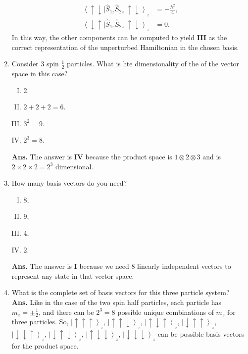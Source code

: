 \documentclass[12pt]{article}
\newcommand\half{\frac{1}{2}}
\newcommand\rr{\right \rangle}
\newcommand\ls{\left |}
\begin{document}
\begin{enumerate}[1.]
$$\begin{aligned}
             \left \langle \uparrow \downarrow \right | \hat{S}_{1z} \hat{S}_{2z} \left | \uparrow \downarrow \right \rangle _z & = -\frac{\hbar^2}{4}, \\
             \left \langle \downarrow \uparrow \right | \hat{S}_{1z} \hat{S}_{2z} \left | \uparrow \downarrow \right \rangle _z & = 0.
       \end{aligned}
       $$
       In this way, the other components can be computed to yield \textbf{III} as the correct representation of the unperturbed Hamiltonian in the chosen basis.
\item Consider 3 spin $\frac{1}{2}$ particles. What is hte dimensionality of the of the vector space in this case?
       \begin{enumerate}[I.]
              \item 2.
              \item $2+2+2=6$.
              \item $3^2=9$.
              \item $2^3=8$. \newline
       \end{enumerate}
\textbf{Ans.} The answer is \textbf{IV} because the product space is $1 \otimes 2 \otimes 3$ and is $2 \times 2 \times 2 = 2^3$ dimensional.
\item How many basis vectors do you need?
       \begin{enumerate}[I.]
              \item 8,
              \item 9,
              \item 4, 
              \item 2. \newline
       \end{enumerate}
\textbf{Ans.} The answer is \textbf{I} because we need 8 linearly independent vectors to represent any state in that vector space.
\item What is the complete set of basis vectors for this three particle system? \\ \newline
\textbf{Ans.} Like in the case of the two spin half particles, each particle has $m_z=\pm \half $, and there can be $2^3=8$ possible unique combinations of $m_z$ for three particles. So, $ \ls \uparrow \uparrow \uparrow \rr _z$, $ \ls \uparrow \uparrow \downarrow \rr _z$, $ \ls \uparrow \downarrow \uparrow \rr _z$, $ \ls \downarrow \uparrow \uparrow \rr _z$, $ \ls \downarrow \downarrow \uparrow \rr _z$, $ \ls \downarrow \uparrow \downarrow \rr _z$, $ \ls \uparrow \downarrow \downarrow \rr _z$, $ \ls \downarrow \downarrow \downarrow \rr _z$  can be possible basis vectors for the product space.

\end{enumerate}
\end{document}

